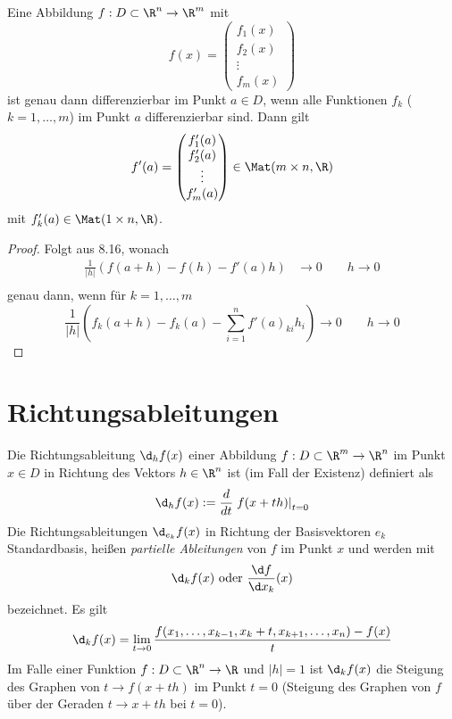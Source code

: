 \documentclass{mycourse}
\begin{document}
\setcounter{thm}{0}
\begin{st}
\label{13.1}
Eine Abbildung $f:D\subset \R^n\to \R^m$ mit
\[
f(x)=\begin{pmatrix}f_1(x)\\f_2(x)\\\vdots\\f_m(x)\end{pmatrix}
\]
ist genau dann differenzierbar im Punkt $a\in D$, wenn alle Funktionen
$f_k$  ($k=1,\dotsc,m$) im Punkt $a$ differenzierbar sind.
Dann gilt
\[
f'(a)=\begin{pmatrix}f_1'(a)\\f_2'(a)\\\vdots\\f_m'(a)\end{pmatrix}\in \Mat(m\times n, \R)
\]
mit $f_k'(a)\in \Mat(1\times n, \R)$.
\begin{proof}
Folgt aus 8.16, wonach 
\begin{align*}
\frac 1{|h|}(f(a+h)-f(h)-f'(a)h) &\to 0 \qquad h\to 0\\
\end{align*}
genau dann, wenn für $k=1,\dotsc, m$
\[
\frac 1{|h|}(f_k(a+h)-f_k(a)-\sum_{i=1}^nf'(a)_{ki}h_i) \to 0 \qquad h\to 0
\]
\end{proof}
\end{st}

\section*{Richtungsableitungen}

Die Richtungsableitung $\d_hf(x)$ einer Abbildung $f:D\subset \R^m \to \R^n$ im Punkt $x\in D$ in 
Richtung des Vektors $h\in \R^n$ ist (im Fall der Existenz) definiert als
\[
\d_hf(x) := \frac d{dt}\left.f(x+th)\right|_{t=0}
\]
Die Richtungsableitungen $\d_{e_k}f(x)$ in Richtung der Basisvektoren
$e_k$ Standardbasis, heißen \emph{partielle Ableitungen} von $f$ im Punkt $x$ und werden mit
\[
\d_kf(x) \text{ oder } \frac {\d f}{\d x_k}(x)
\]
bezeichnet.
Es gilt
\[
		\d_kf(x)=\lim_{t\to 0}\frac {f(x_1,\dotsc,x_{k-1},x_k+t,x_{k+1},\dotsc,x_n)-f(x)}t
\]
Im Falle einer Funktion $f:D\subset \R^n\to \R$ und $|h|=1$ ist $\d_kf(x)$ die Steigung des Graphen von
$t\to f(x+th)$ im Punkt $t=0$ (Steigung des Graphen von $f$ über der Geraden $t\to x+th$ bei $t=0$).
\end{document}
